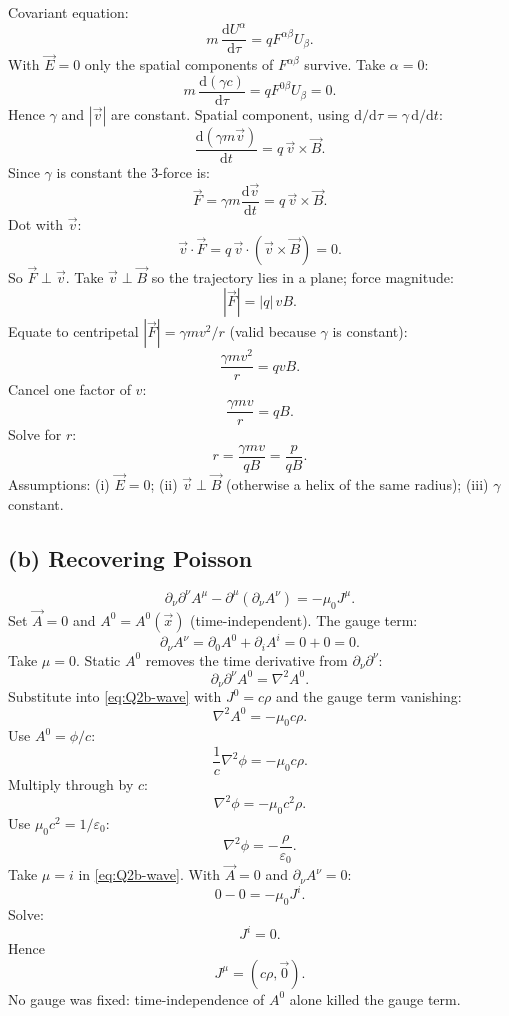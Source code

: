 \documentclass[11pt]{article}
\newcommand{\de}{\mathrm{d}}
\begin{document}
Covariant equation:
\begin{equation}
m\,\frac{\de U^\alpha}{\de\tau}=qF^{\alpha\beta}U_\beta.
\end{equation}
With $\vec E=0$ only the spatial components of $F^{\alpha\beta}$ survive. Take $\alpha=0$:
\[ m\,\frac{\de(\gamma c)}{\de\tau}=qF^{0\beta}U_\beta=0. \]
Hence $\gamma$ and $|\vec v|$ are constant. Spatial component, using $\de/\de\tau=\gamma\,\de/\de t$:
\[ \frac{\de(\gamma m\vec v)}{\de t}=q\,\vec v\times\vec B. \]
Since $\gamma$ is constant the 3-force is:
\[ \vec F=\gamma m\frac{\de\vec v}{\de t}=q\,\vec v\times\vec B. \]
Dot with $\vec v$:
\[ \vec v\cdot\vec F=q\,\vec v\cdot(\vec v\times\vec B)=0. \]
So $\vec F\perp\vec v$. Take $\vec v\perp\vec B$ so the trajectory lies in a plane; force magnitude:
\[ |\vec F|=|q|\,vB. \]
Equate to centripetal $|\vec F|=\gamma m v^2/r$ (valid because $\gamma$ is constant):
\[ \frac{\gamma mv^2}{r}=qvB. \]
Cancel one factor of $v$:
\[ \frac{\gamma mv}{r}=qB. \]
Solve for $r$:
\begin{equation}
\boxed{\,r=\frac{\gamma mv}{qB}=\frac{p}{qB}.\,}
\end{equation}
Assumptions: (i) $\vec E=0$; (ii) $\vec v\perp\vec B$ (otherwise a helix of the same radius); (iii) $\gamma$ constant.

\subsection*{(b) Recovering Poisson}

\begin{equation}
\partial_\nu\partial^\nu A^\mu-\partial^\mu(\partial_\nu A^\nu)=-\mu_0 J^\mu.
\label{eq:Q2b-wave}
\end{equation}
Set $\vec A=0$ and $A^0=A^0(\vec x)$ (time-independent). The gauge term:
\[ \partial_\nu A^\nu=\partial_0 A^0+\partial_i A^i=0+0=0. \]
Take $\mu=0$. Static $A^0$ removes the time derivative from $\partial_\nu\partial^\nu$:
\[ \partial_\nu\partial^\nu A^0=\nabla^2 A^0. \]
Substitute into \eqref{eq:Q2b-wave} with $J^0=c\rho$ and the gauge term vanishing:
\[ \nabla^2 A^0=-\mu_0 c\rho. \]
Use $A^0=\phi/c$:
\[ \frac{1}{c}\nabla^2\phi=-\mu_0 c\rho. \]
Multiply through by $c$:
\[ \nabla^2\phi=-\mu_0 c^2\rho. \]
Use $\mu_0 c^2=1/\varepsilon_0$:
\begin{equation}
\boxed{\,\nabla^2\phi=-\frac{\rho}{\varepsilon_0}.\,}
\end{equation}
Take $\mu=i$ in \eqref{eq:Q2b-wave}. With $\vec A=0$ and $\partial_\nu A^\nu=0$:
\[ 0-0=-\mu_0 J^i. \]
Solve:
\[ J^i=0. \]
Hence
\begin{equation}
\boxed{\,J^\mu=(c\rho,\vec 0).\,}
\end{equation}
No gauge was fixed: time-independence of $A^0$ alone killed the gauge term.
\end{document}
